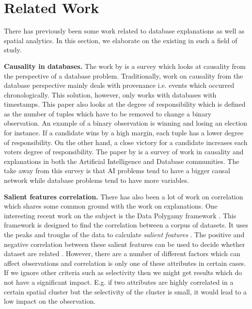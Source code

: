 \section{Related Work}
There has previously been some work related to database explanations as well as spatial analytics. 
In this section, we elaborate on the existing in such a field of study. 

{\bf Causality in databases.} The work by \cite{meliou2010causality} is a survey which looks at causality from the perspective of a database problem. Traditionally, work on causality from the database perspective mainly deals with provenance i.e. events which occurred chronologically. This solution, however, only works with databases with timestamps. This paper also looks at the degree of responsibility which is defined as the number of tuples which have to be removed to change a binary observation. An example of a binary observation is winning and losing an election for instance. If a candidate wins by a high margin, each tuple has a lower degree of responsibility. On the other hand, a close victory for a candidate increases each voters degree of responsibility. The paper by \cite{meliou2014causality} is a survey of work in causality and explanations in both the Artificial Intelligence and Database communities. The take away from this survey is that AI problems tend to have a bigger causal network while database problems tend to have more variables.

{\bf Salient features correlation.} There has also been a lot of work on correlation which shares some common ground with the work on explanations. One interesting recent work on the subject is the Data Polygamy framework \cite{chirigati2016data}. This framework is designed to find the correlation between a corpus of datasets. It uses the peaks and troughs of the data to calculate \textit{salient features} \cite{dunn1986applied}. The positive and negative correlation between these salient features can be used to decide whether dataset are related \cite{su2014supporting}. 
However, there are a number of different factors which can affect observations and correlation is only one of these attributes in certain cases. 
If we ignore other criteria such as selectivity then we might get results which do not have a significant impact. E.g. if two attributes are highly correlated in a certain spatial cluster but the selectivity of the cluster is small, it would lead to a low impact on the observation.

